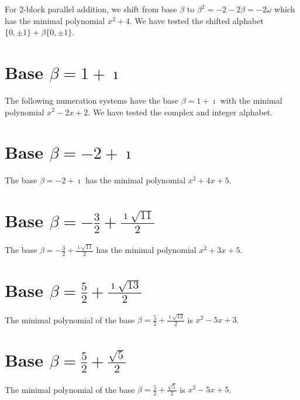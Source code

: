 For 2-block parallel addition, we shift from base $\beta$ to $\beta^2=-2-2\beta=-2\omega$ which has the minimal polynomial $x^{2} + 4$. We have tested the shifted alphabet $\{0,\pm 1\}+\beta \{0,\pm 1\}$.



\section{\texorpdfstring{Base $\beta = 1 + \imath$}{Base beta = 1 + i}}
The following numeration systems have the base $\beta =1 + \imath$ with the minimal polynomial $x^2-2x+2$. We have tested the complex and integer alphabet. 



 

\section{\texorpdfstring{Base $\beta = -2 + \imath$}{Base beta = -2 + i}}
The base  $\beta = -2 + \imath$ has the minimal polynomial $x^2+4x +5$.

% 
\section{\texorpdfstring{Base $\beta = -\frac{3}{2} + \frac{\imath \sqrt{11}}{2}$}{Base beta = -{3}/{2} + i sqrt(11)/{2}}}
The base $\beta = -\frac{3}{2} + \frac{\imath \sqrt{11}}{2}$ has the minimal polynomial  $x^2+3x +5$.


\section{\texorpdfstring{Base $\beta = \frac{5}{2} + \frac{\imath \sqrt{13}}{2}$}{Base beta = {5}/{2} + i sqrt(13)/2}}
The minimal polynomial of the base $\beta = \frac{5}{2} + \frac{\imath \sqrt{13}}{2}$ is $x^2 -5x+3$.


\section{\texorpdfstring{Base $\beta = \frac{5}{2} + \frac{\sqrt{5}}{2}$}{Base beta = {5}/{2} + sqrt(5)/{2}}}
The minimal polynomial of the base $\beta = \frac{5}{2} + \frac{\sqrt{5}}{2}$ is $x^2 -5x+5$.



